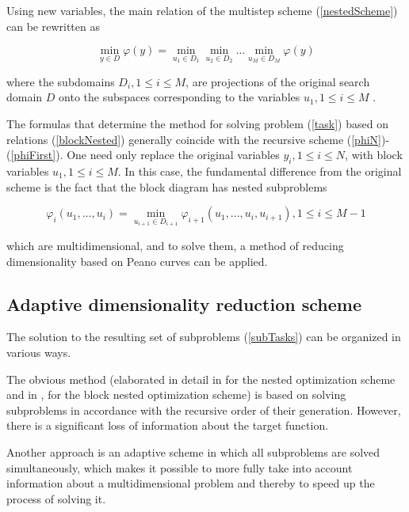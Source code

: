 \documentclass{svproc}
\begin{document}
Using new variables, the main relation of the multistep scheme (\ref{nestedScheme}) can be rewritten as

\begin{equation}
\label{blockNested}
\min_{y\in D} \varphi(y)=\min_{u_1\in D_1}\min_{u_2\in D_2}\dots\min_{u_M\in D_M}\varphi(y)
\end{equation}

where the subdomains  \(D_i,1\leqslant i\leqslant M\), are projections of the original search domain \(D\) onto the subspaces corresponding to the variables \(u_1,1\leqslant i\leqslant M\) .

The formulas that determine the method for solving problem (\ref{task}) based on relations (\ref{blockNested}) generally coincide with the recursive scheme (\ref{phiN})-(\ref{phiFirst}). One need only replace the original variables  \(y_i,1\leqslant i\leqslant N\), with block variables  \(u_1,1\leqslant i\leqslant M\). 
In this case, the fundamental difference from the original scheme is the fact that the block diagram has nested subproblems

\begin{equation}
\label{subTasks}
\varphi_i(u_1,\dots,u_i)=\min_{u_{i+1}\in D_{i+1}}\varphi_{i+1}(u_1,\dots,u_i,u_{i+1}),1\leqslant i\leqslant M-1
\end{equation}

which are multidimensional, and to solve them, a method of reducing dimensionality based on Peano curves can be applied.

\subsection{Adaptive dimensionality reduction scheme}

The solution to the resulting set of subproblems (\ref{subTasks}) can be organized in various ways.

The obvious method (elaborated in detail in \cite{Grishagin1997,Grishagin2001,Grishagin2015} for the nested optimization scheme and in \cite{Barkalov2014},\cite{Ref27} for the block nested optimization scheme) is based on solving subproblems in accordance with the recursive order of their generation. However, there is a significant loss of information about the target function.

Another approach is an adaptive scheme in which all subproblems are solved simultaneously, which makes it possible to more fully take into account information about a multidimensional problem and thereby to speed up the process of solving it.
\end{document}
